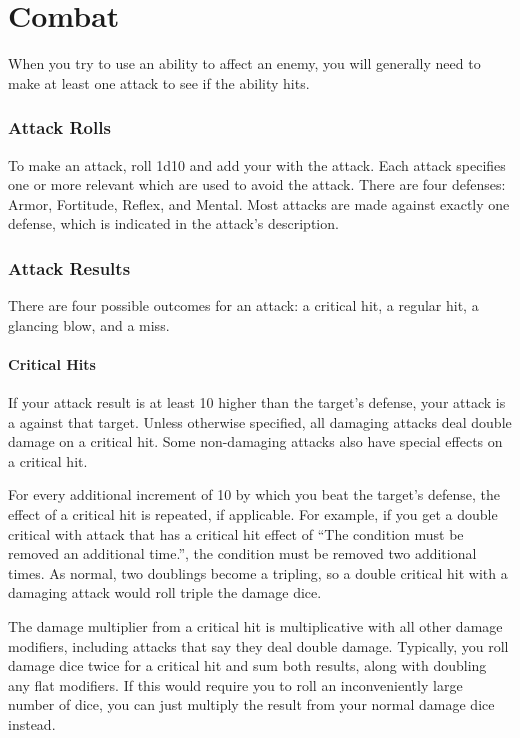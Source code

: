 \chapter{Combat}\label{Combat}

  When you try to use an ability to affect an enemy, you will generally need to make at least one attack to see if the ability hits.

  \subsection{Attack Rolls}\label{Attack Rolls}
    To make an attack, roll 1d10 and add your  with the attack.
    Each attack specifies one or more relevant  which are used to avoid the attack.
    There are four defenses: Armor, Fortitude, Reflex, and Mental.
    Most attacks are made against exactly one defense, which is indicated in the attack's description.

  \subsection{Attack Results}
    There are four possible outcomes for an attack: a critical hit, a regular hit, a glancing blow, and a miss.

    \subsubsection{Critical Hits}\label{Critical Hits}
      If your attack result is at least 10 higher than the target's defense, your attack is a  against that target.
      Unless otherwise specified, all damaging attacks deal double damage on a critical hit.
      Some non-damaging attacks also have special effects on a critical hit.

      For every additional increment of 10 by which you beat the target's defense, the effect of a critical hit is repeated, if applicable.
      For example, if you get a double critical with attack that has a critical hit effect of ``The condition must be removed an additional time.'', the condition must be removed two additional times.
      As normal, two doublings become a tripling, so a double critical hit with a damaging attack would roll triple the damage dice.

      The damage multiplier from a critical hit is multiplicative with all other damage modifiers, including attacks that say they deal double damage.
      Typically, you roll damage dice twice for a critical hit and sum both results, along with doubling any flat modifiers.
      If this would require you to roll an inconveniently large number of dice, you can just multiply the result from your normal damage dice instead.

